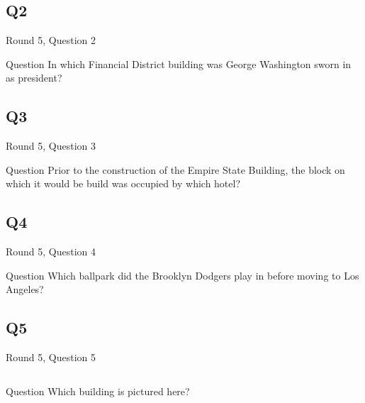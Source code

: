 \documentclass[11pt]{beamer}
\begin{document}
\subsection*{Q2}
\begin{frame}[t]{Round 5, Question 2}
\begin{block}{Question}
In which Financial District building was George Washington sworn in as president?
\end{block}
\end{frame}
\subsection*{Q3}
\begin{frame}[t]{Round 5, Question 3}
\begin{block}{Question}
Prior to the construction of the Empire State Building, the block on which it would be build was occupied by which hotel?
\end{block}
\end{frame}
\subsection*{Q4}
\begin{frame}[t]{Round 5, Question 4}
\begin{block}{Question}
Which ballpark did the Brooklyn Dodgers play in before moving to Los Angeles?
\end{block}
\end{frame}
\subsection*{Q5}
\begin{frame}[t]{Round 5, Question 5}
\begin{columns}[T,totalwidth=\linewidth]
\begin{column}{0.32\linewidth}
\begin{block}{Question}
Which building is pictured here?
\end{block}
\end{column}
\begin{column}{0.65\linewidth}
\begin{center}
\texttt{[image: \{Images/woolworth]}.jpg}
\end{center}
\end{column}
\end{columns}
\end{frame}
\end{document}
